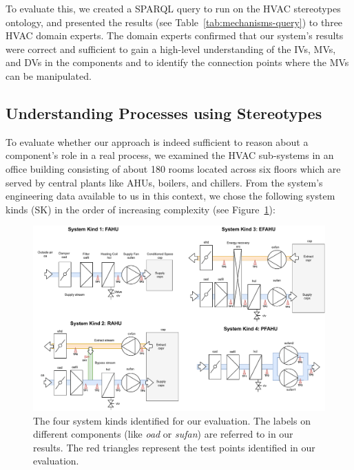 \documentclass[sigconf]{acmart}
\begin{document}
To evaluate this, we created a SPARQL query to run on the HVAC stereotypes ontology, and presented the results (see Table~\ref{tab:mechanisms-query}) to three HVAC domain experts.
The domain experts confirmed that our system's results were correct and sufficient to gain a high-level understanding of the IVs, MVs, and DVs in the components and to identify the connection points where the MVs can be manipulated.


\subsection{Understanding Processes using Stereotypes}
\label{subsec:Deployment}

To evaluate whether our approach is indeed sufficient to reason about a component's role in a real process, we examined the HVAC sub-systems in an office building consisting of about 180 rooms located across six floors which are served by central plants like AHUs, boilers, and chillers. 
%
From the system's engineering data available to us in this context, we chose the following system kinds (SK) in the order of increasing complexity (see Figure~\ref{fig:four-kinds-of-systems}):

\begin{figure}[t]
\centering
\includegraphics[width=0.78\linewidth]{figures/e_four_system_kinds.pdf}
\caption{The four system kinds identified for our evaluation. The labels on different components (like \textit{oad} or \textit{sufan}) are referred to in our results. The red triangles represent the test points identified in our evaluation.}
\label{fig:four-kinds-of-systems}
\end{figure}
\end{document}
